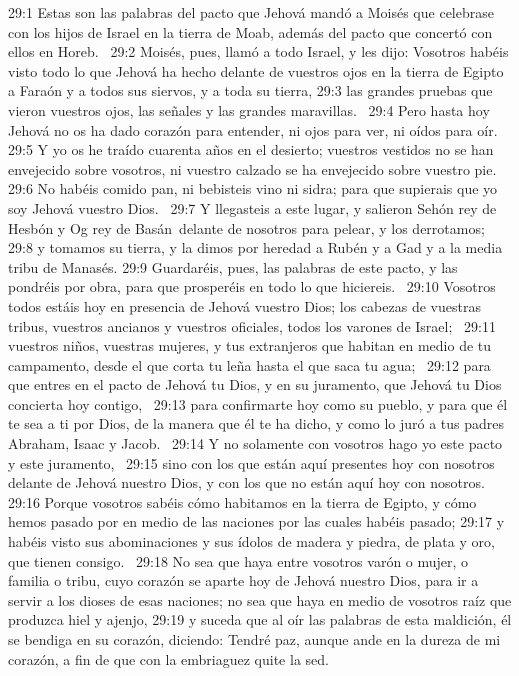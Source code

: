 29:1 Estas son las palabras del pacto que Jehová mandó a Moisés que celebrase con los hijos de Israel en la tierra de Moab, además del pacto que concertó con ellos en Horeb.  
29:2 Moisés, pues, llamó a todo Israel, y les dijo: Vosotros habéis visto todo lo que Jehová ha hecho delante de vuestros ojos en la tierra de Egipto a Faraón y a todos sus siervos, y a toda su tierra, 
29:3 las grandes pruebas que vieron vuestros ojos, las señales y las grandes maravillas.  
29:4 Pero hasta hoy Jehová no os ha dado corazón para entender, ni ojos para ver, ni oídos para oír.  
29:5 Y yo os he traído cuarenta años en el desierto; vuestros vestidos no se han envejecido sobre vosotros, ni vuestro calzado se ha envejecido sobre vuestro pie.  
29:6 No habéis comido pan, ni bebisteis vino ni sidra; para que supierais que yo soy Jehová vuestro Dios.  
29:7 Y llegasteis a este lugar, y salieron Sehón rey de Hesbón y Og rey de Basán delante de nosotros para pelear, y los derrotamos;  
29:8 y tomamos su tierra, y la dimos por heredad a Rubén y a Gad y a la media tribu de Manasés. 
29:9 Guardaréis, pues, las palabras de este pacto, y las pondréis por obra, para que prosperéis en todo lo que hiciereis.  
29:10 Vosotros todos estáis hoy en presencia de Jehová vuestro Dios; los cabezas de vuestras tribus, vuestros ancianos y vuestros oficiales, todos los varones de Israel;  
29:11 vuestros niños, vuestras mujeres, y tus extranjeros que habitan en medio de tu campamento, desde el que corta tu leña hasta el que saca tu agua;  
29:12 para que entres en el pacto de Jehová tu Dios, y en su juramento, que Jehová tu Dios concierta hoy contigo,  
29:13 para confirmarte hoy como su pueblo, y para que él te sea a ti por Dios, de la manera que él te ha dicho, y como lo juró a tus padres Abraham, Isaac y Jacob.  
29:14 Y no solamente con vosotros hago yo este pacto y este juramento,  
29:15 sino con los que están aquí presentes hoy con nosotros delante de Jehová nuestro Dios, y con los que no están aquí hoy con nosotros.  
29:16 Porque vosotros sabéis cómo habitamos en la tierra de Egipto, y cómo hemos pasado por en medio de las naciones por las cuales habéis pasado; 
29:17 y habéis visto sus abominaciones y sus ídolos de madera y piedra, de plata y oro, que tienen consigo.  
29:18 No sea que haya entre vosotros varón o mujer, o familia o tribu, cuyo corazón se aparte hoy de Jehová nuestro Dios, para ir a servir a los dioses de esas naciones; no sea que haya en medio de vosotros raíz que produzca hiel y ajenjo, 
29:19 y suceda que al oír las palabras de esta maldición, él se bendiga en su corazón, diciendo: Tendré paz, aunque ande en la dureza de mi corazón, a fin de que con la embriaguez quite la sed.  
